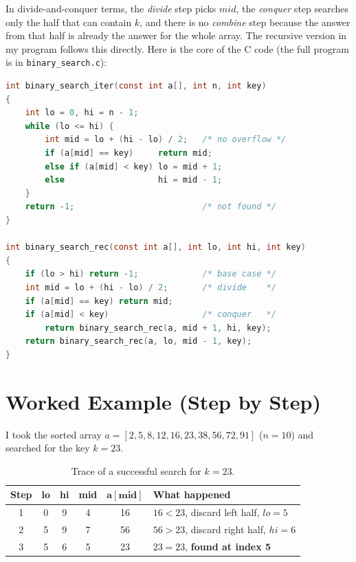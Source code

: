\documentclass[11pt,a4paper]{article}
\newif\ifshowguidance
\newcommand{\guidance}[1]{\ifshowguidance\begin{guidancebox}#1\end{guidancebox}\fi}
\begin{document}
In divide-and-conquer terms, the \emph{divide} step picks $\mathit{mid}$, the
\emph{conquer} step searches only the half that can contain $k$, and there is no
\emph{combine} step because the answer from that half is already the answer for
the whole array. The recursive version in my program follows this directly. Here
is the core of the C code (the full program is in \texttt{binary\_search.c}):

\begin{lstlisting}[language=C]
int binary_search_iter(const int a[], int n, int key)
{
    int lo = 0, hi = n - 1;
    while (lo <= hi) {
        int mid = lo + (hi - lo) / 2;   /* no overflow */
        if (a[mid] == key)     return mid;
        else if (a[mid] < key) lo = mid + 1;
        else                   hi = mid - 1;
    }
    return -1;                          /* not found */
}

int binary_search_rec(const int a[], int lo, int hi, int key)
{
    if (lo > hi) return -1;             /* base case */
    int mid = lo + (hi - lo) / 2;       /* divide    */
    if (a[mid] == key) return mid;
    if (a[mid] < key)                   /* conquer   */
        return binary_search_rec(a, mid + 1, hi, key);
    return binary_search_rec(a, lo, mid - 1, key);
}
\end{lstlisting}

\section{Worked Example (Step by Step)}
\guidance{Complete hand trace.}

I took the sorted array $a=[2,5,8,12,16,23,38,56,72,91]$ ($n=10$) and searched for
the key $k=23$.

\begin{table}[h]
\centering
\begin{tabular}{@{}cccccl@{}}
\toprule
\textbf{Step} & \textbf{lo} & \textbf{hi} & \textbf{mid} & $\mathbf{a[mid]}$ & \textbf{What happened} \\
\midrule
1 & 0 & 9 & 4 & 16 & $16<23$, discard left half, $\mathit{lo}=5$ \\
2 & 5 & 9 & 7 & 56 & $56>23$, discard right half, $\mathit{hi}=6$ \\
3 & 5 & 6 & 5 & 23 & $23=23$, \textbf{found at index 5} \\
\bottomrule
\end{tabular}
\caption{Trace of a successful search for $k=23$.}
\end{table}
\end{document}
